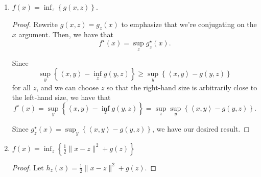 \documentclass[11pt]{amsart}
\begin{document}
\begin{enumerate}
\begin{enumerate}
\begin{proof}
    \begin{align*}
      f^\star\left(x\right)
      &= \sup_{y} \left\{\left\langle x, y \right\rangle - f(y)\right\} \\
      &= \sup_{y} \left\{\left\langle x, y \right\rangle - g(y - a)\right\} \\
      &= \sup_{y} \left\{\left\langle x, y \right\rangle -
        \left\langle y, b \right\rangle - g(y - a)\right\} \\
      &= \sup_{y} \left\{\left\langle x - b, y \right\rangle - g(y - a)\right\} \\
      &= \sup_{y} \left\{
        \left\langle x - b, a \right\rangle + 
        \left\langle x - b, y - a \right\rangle - g(y - a)\right\} \\
      &= \left\langle x - b, a \right\rangle + \sup_{y} \left\{
        \left\langle x - b, y - a \right\rangle - g(y - a)\right\} \\
      &= \left\langle x - b, a \right\rangle + g^\star(x - b)
    \end{align*}
    since shiftfing by $a$ does not change the supremum.
  \end{proof}
\item $f(x) = \inf_z \left\{g(x,z)\right\}$.
  \begin{proof}
    Rewrite $g(x,z) = g_z(x)$ to emphasize that we're conjugating on the $x$
    argument. Then, we have that
    \begin{equation*}
      \boxed{f^\star\left(x\right) = \sup_z g_z^\star(x).}
    \end{equation*}

    Since
    \begin{equation*}
      \sup_{y} \left\{\left\langle x, y \right\rangle - \inf_zg(y, z)\right\}
      \geq
      \sup_{y} \left\{\left\langle x, y \right\rangle - g(y, z)\right\}
    \end{equation*}
    for all $z$, and we can choose $z$ so that the right-hand size is
    arbitrarily close to the left-hand size, we have that
    \begin{equation*}
      f^\star\left(x\right)
      = \sup_{y} \left\{\left\langle x, y \right\rangle - \inf_zg(y, z)\right\}
      = \sup_z\sup_{y} \left\{\left\langle x, y \right\rangle - g(y, z)\right\}.
    \end{equation*}

    Since
    $g^\star_z(x) = \sup_{y} \left\{\left\langle x, y \right\rangle - g(y,
      z)\right\}$, we have our desired result.        
  \end{proof}
\item $f(x) = \inf_z \left\{\frac{1}{2}\|x-z\|^2 + g(z)\right\}$
  \begin{proof}
    Let $h_z(x) = \frac{1}{2}\|x-z\|^2 + g(z)$.



\end{proof}
\end{enumerate}
\end{enumerate}
\end{document}
